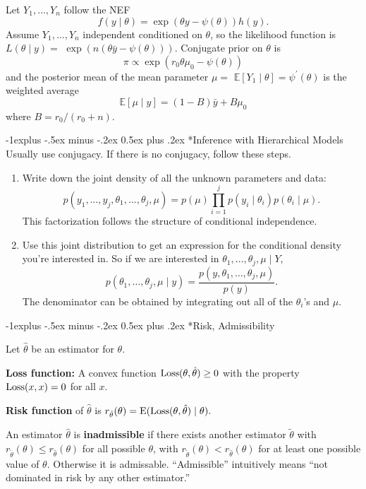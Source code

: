 \documentclass[10pt,landscape]{article}
\makeatletter
\renewcommand{\subsection}{\@startsection{subsection}{2}{0mm}%
                                {-1explus -.5ex minus -.2ex}%
                                {0.5ex plus .2ex}%
                                {\normalfont\normalsize\bfseries}}
\newcommand{\E}{\text{E}}
\makeatother
\begin{document}
\begin{multicols*}{3}
Let $Y_1, \ldots, Y_n$ follow the NEF
$$
f(y \mid \theta)=\exp (\theta y-\psi(\theta)) h(y) .
$$
Assume $Y_1, \ldots, Y_n$ independent conditioned on $\theta$, so the likelihood function is $L(\theta \mid y)=$ $\exp (n(\theta \bar{y}-\psi(\theta)))$. Conjugate prior on $\theta$ is
$$
\pi \propto \exp \left(r_0 \theta \mu_0-\psi(\theta)\right)
$$
and the posterior mean of the mean parameter $\mu=$ $\mathbb{E}\left[Y_1 \mid \theta\right]=\psi^{\prime}(\theta)$ is the weighted average
$$
\mathbb{E}[\mu \mid y]=(1-B) \bar{y}+B \mu_0
$$
where $B=r_0 /\left(r_0+n\right)$.

\subsection*{Inference with Hierarchical Models}
Usually use conjugacy. If there is no conjugacy, follow these steps.
\begin{enumerate}
\item Write down the joint density of all the unknown parameters and data: $$p(y_1,\dots,y_j,\theta_1,\dots,\theta_j,\mu)= p(\mu)\prod_{i=1}^j p(y_i\mid \theta_i)p(\theta_i\mid \mu).$$ This factorization follows the structure of conditional independence.
\item Use this joint distribution to get an expression for the conditional density you're interested in.
So if we are interested in $\theta_1, \ldots, \theta_j, \mu \mid Y$, $$p(\theta_1,\dots,\theta_j,\mu\mid y)=\frac{p(y,\theta_1,\dots,\theta_j,\mu)}{p(y)}.$$ The denominator can be obtained by integrating out all of the $\theta_i$'s and $\mu$.
\end{enumerate}

\subsection*{Risk, Admissibility}

Let $\hat{\theta}$ be an estimator for $\theta$.

\textbf{Loss function:} A convex function $\operatorname{Loss}(\theta,\hat\theta)\geq 0$ with the property $\operatorname{Loss}(x,x)=0$ for all $x.$

\textbf{Risk function} of $\hat{\theta}$ is $r_{\hat{\theta}}(\theta)=\E (\Loss(\theta,\hat{\theta})\mid \theta).$

An estimator $\hat{\theta}$ is \textbf{inadmissible} if there exists another estimator $\tilde\theta$ with $r_{\tilde\theta}(\theta)\leq r_{\hat\theta}(\theta)$ for all possible $\theta$, with $r_{\tilde\theta}(\theta)< r_{\hat\theta}(\theta)$ for at least one possible value of $\theta$. Otherwise it is admissable. ``Admissible'' intuitively means ``not dominated in risk by any other estimator.''

\end{multicols*}
\end{document}
